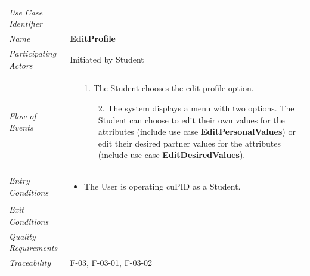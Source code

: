 \documentclass[12pt,letterpaper]{article}
\begin{document}
\begin{center}
	\begin{tabu} to 
		\toprule
		Use Case Identifier & \editprofile{} \\
		Name & {\bf EditProfile} \\
		Participating Actors & Initiated by Student \\
		Flow of Events & 
		\begin{minipage}[t]{\linewidth}
		    \begin{enumerate}
		    		\item[1.] The Student chooses the edit profile option.
		    		\begin{enumerate}
			    		\item[2.] The system displays a menu with two options. The Student can choose to edit their own values for the attributes (include use case \textbf{EditPersonalValues}) or edit their desired partner values for the attributes (include use case \textbf{EditDesiredValues}).
		    		\end{enumerate}
			\end{enumerate}
		\end{minipage} \\

		Entry Conditions &
		\begin{minipage}[t]{\linewidth}
			\begin{itemize}
			    \item The User is operating cuPID as a Student.
	        \end{itemize}
		\end{minipage} \\

		Exit Conditions & \\

		Quality Requirements & \\

		Traceability &  F-03, F-03-01, F-03-02 \\
		\toprule
	\end{tabu}
\end{center}
\end{document}
